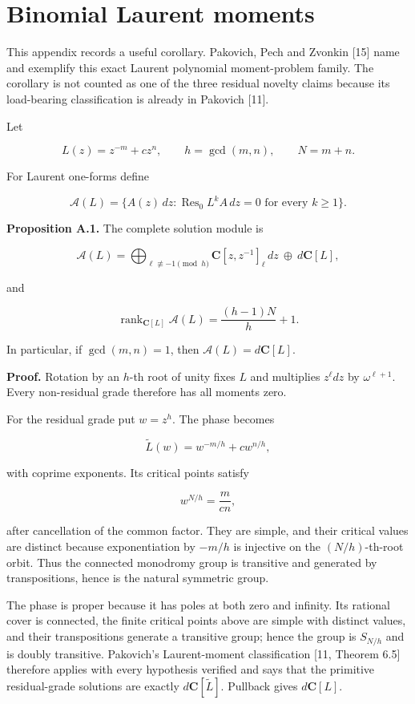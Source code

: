 \documentclass[
  11pt,
  a4paper,
]{amsart}
\begin{document}
\appendix

\section{Binomial Laurent moments}

This appendix records a useful corollary. Pakovich, Pech and Zvonkin
{[}15{]} name and exemplify this exact Laurent polynomial moment-problem
family. The corollary is not counted as one of the three residual
novelty claims because its load-bearing classification is already in
Pakovich {[}11{]}.

Let

\[
L(z)=z^{-m}+cz^n,\qquad h=\gcd(m,n),\qquad N=m+n.
\]

For Laurent one-forms define

\[
\mathcal A(L)=
\{A(z)\,dz:\operatorname{Res}_0L^kA\,dz=0
\text{ for every }k\ge1\}.
\]

\textbf{Proposition A.1.} The complete solution module is

\[
\mathcal A(L)=
\bigoplus_{\ell\not\equiv-1\pmod h}
\mathbf C[z,z^{-1}]_\ell\,dz
\ \oplus\ d\mathbf C[L],
\]

and

\[
\operatorname{rank}_{\mathbf C[L]}\mathcal A(L)
=\frac{(h-1)N}{h}+1.
\]

In particular, if \(\gcd(m,n)=1\), then \(\mathcal A(L)=d\mathbf C[L]\).

\textbf{Proof.} Rotation by an \(h\)-th root of unity fixes \(L\) and
multiplies \(z^\ell dz\) by \(\omega^{\ell+1}\). Every non-residual
grade therefore has all moments zero.

For the residual grade put \(w=z^h\). The phase becomes

\[
\widetilde L(w)=w^{-m/h}+cw^{n/h},
\]

with coprime exponents. Its critical points satisfy

\[
w^{N/h}=\frac{m}{cn},
\]

after cancellation of the common factor. They are simple, and their
critical values are distinct because exponentiation by \(-m/h\) is
injective on the \((N/h)\)-th-root orbit. Thus the connected monodromy
group is transitive and generated by transpositions, hence is the
natural symmetric group.

The phase is proper because it has poles at both zero and infinity. Its
rational cover is connected, the finite critical points above are simple
with distinct values, and their transpositions generate a transitive
group; hence the group is \(S_{N/h}\) and is doubly transitive.
Pakovich's Laurent-moment classification {[}11, Theorem 6.5{]} therefore
applies with every hypothesis verified and says that the primitive
residual-grade solutions are exactly \(d\mathbf C[\widetilde L]\).
Pullback gives \(d\mathbf C[L]\).
\end{document}
